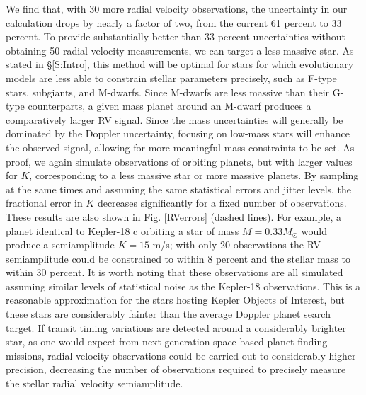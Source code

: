 We find that, with 30 more radial velocity observations, the uncertainty in our calculation drops by nearly a factor of two, from the current 61 percent to 33 percent. To provide substantially better than 33 percent uncertainties without obtaining 50 radial velocity measurements, we can target a less massive star. As stated in \S \ref{S:Intro}, this method will be optimal for stars for which evolutionary models are less able to constrain stellar parameters precisely, such as F-type stars, subgiants, and M-dwarfs. Since M-dwarfs are less massive than their G-type counterparts, a given mass planet around an M-dwarf produces a comparatively larger RV signal. Since the mass uncertainties will generally be dominated by the Doppler uncertainty, focusing on low-mass stars will enhance the observed signal, allowing for more meaningful mass constraints to be set. As proof, we again simulate observations of orbiting planets, but with larger values for $K$, corresponding to a less massive star or more massive planets. By sampling at the same times and assuming the same statistical errors and jitter levels, the fractional error in $K$ decreases significantly for a fixed number of observations. These results are also shown in Fig. \ref{RVerrors} (dashed lines). For example, a planet identical to Kepler-18 c orbiting a star of mass $M = 0.33 M_\odot$ would produce a semiamplitude $K = 15$ m/s; with only 20 observations the RV semiamplitude could be constrained to within 8 percent and the stellar mass to within 30 percent. It is worth noting that these observations are all simulated assuming similar levels of statistical noise as the Kepler-18 observations. This is a reasonable approximation for the stars hosting Kepler Objects of Interest, but these stars are considerably fainter than the average Doppler planet search target. If transit timing variations are detected around a considerably brighter star, as one would expect from next-generation space-based planet finding missions, radial velocity observations could be carried out to considerably higher precision, decreasing the number of observations required to precisely measure the stellar radial velocity semiamplitude.


